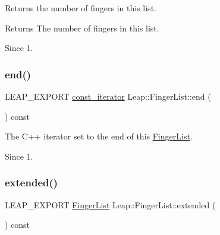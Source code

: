 Returns the number of fingers in this list.


\begin{DoxyCodeInclude}
\end{DoxyCodeInclude}


\begin{DoxyReturn}{Returns}
The number of fingers in this list. 
\end{DoxyReturn}
\begin{DoxySince}{Since}
1. 
\end{DoxySince}
\mbox{\label{class_leap_1_1_finger_list_a75479dbb992e84540e66179c90bd67bd}} 
\subsubsection{\texorpdfstring{end()}{end()}}
{\footnotesize\ttfamily L\+E\+A\+P\+\_\+\+E\+X\+P\+O\+RT \hyperlink{class_leap_1_1_finger_list_a9ecff6e555096064a09bb66a8cb5e567}{const\+\_\+iterator} Leap\+::\+Finger\+List\+::end (\begin{DoxyParamCaption}{ }\end{DoxyParamCaption}) const}

The C++ iterator set to the end of this \hyperlink{class_leap_1_1_finger_list}{Finger\+List}.


\begin{DoxyCodeInclude}
\end{DoxyCodeInclude}


\begin{DoxySince}{Since}
1. 
\end{DoxySince}
\mbox{\label{class_leap_1_1_finger_list_a32fb005494e5a3a433de76992ac07895}} 
\subsubsection{\texorpdfstring{extended()}{extended()}}
{\footnotesize\ttfamily L\+E\+A\+P\+\_\+\+E\+X\+P\+O\+RT \hyperlink{class_leap_1_1_finger_list}{Finger\+List} Leap\+::\+Finger\+List\+::extended (\begin{DoxyParamCaption}{ }\end{DoxyParamCaption}) const}

